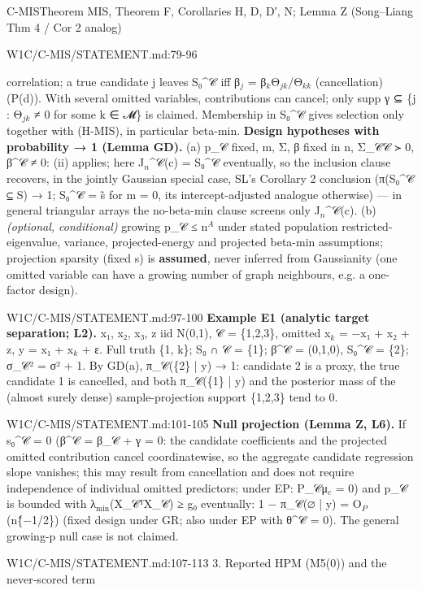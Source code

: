 \begin{card}{C-MIS}{Theorem MIS, Theorem F, Corollaries H, D, D′, N; Lemma Z (Song–Liang Thm 4 / Cor 2 analog)}
\begin{stmt}{W1C/C-MIS/STATEMENT.md:79-96}
\begin{itemize}
correlation; a true candidate j leaves S₀\^{}𝒞 iff β$_{j}$ = β$_{k}$Θ$_{jk}$/Θ$_{kk}$ (cancellation) (P(d)). With several omitted
variables, contributions can cancel; only supp γ ⊆ \{j : Θ$_{jk}$ ≠ 0 for some k ∈ 𝓜\} is claimed. Membership in S₀\^{}𝒞 gives
selection only together with (H-MIS), in particular beta-min.
\textbf{Design hypotheses with probability → 1 (Lemma GD).} (a) p\_𝒞 fixed, m, Σ, β fixed in n, Σ\_𝒞𝒞 ≻ 0, β\^{}𝒞 ≠ 0: (ii)
applies; here J$_{n}$\^{}𝒞(c) = S₀\^{}𝒞 eventually, so the inclusion clause recovers, in the jointly Gaussian special case,
SL's Corollary 2 conclusion (π(S₀\^{}𝒞 ⊆ S) → 1; S₀\^{}𝒞 = s̃ for m = 0, its intercept-adjusted analogue otherwise) — in general triangular arrays the no-beta-min clause screens only J$_{n}$\^{}𝒞(c). (b) \emph{(optional, conditional)} growing p\_𝒞 ≤ n$^{A}$ under stated population restricted-eigenvalue, variance,
projected-energy and projected beta-min assumptions; projection sparsity (fixed s) is \textbf{assumed}, never inferred from
Gaussianity (one omitted variable can have a growing number of graph neighbours, e.g. a one-factor design).
\end{itemize}
\end{stmt}
\begin{stmt}{W1C/C-MIS/STATEMENT.md:97-100}
\textbf{Example E1 (analytic target separation; L2).} x₁, x₂, x₃, z iid N(0,1), 𝒞 = \{1,2,3\}, omitted x$_{k}$ = −x₁ + x₂ + z,
y = x₁ + x$_{k}$ + ε. Full truth \{1, k\}; S₀ ∩ 𝒞 = \{1\}; β\^{}𝒞 = (0,1,0), S₀\^{}𝒞 = \{2\}; σ\_𝒞² = σ² + 1. By GD(a), π\_𝒞(\{2\} | y) → 1:
candidate 2 is a proxy, the true candidate 1 is cancelled, and both π\_𝒞(\{1\} | y) and the posterior mass of the
(almost surely dense) sample-projection support \{1,2,3\} tend to 0.
\end{stmt}
\begin{stmt}{W1C/C-MIS/STATEMENT.md:101-105}
\textbf{Null projection (Lemma Z, L6).} If s₀\^{}𝒞 = 0 (β\^{}𝒞 = β\_𝒞 + γ = 0: the candidate coefficients and the projected omitted
contribution cancel coordinatewise, so the aggregate candidate regression slope vanishes; this may result from cancellation and does
not require independence of individual omitted predictors; under EP:
P\_𝒞μ$_{c}$ = 0) and p\_𝒞 is bounded with λ$_{\mathrm{min}}$(X\_𝒞ᵀX\_𝒞) ≥ g₀ eventually: 1 − π\_𝒞(∅ | y) = O$_{P}$(n\^\{−1/2\})
(fixed design under GR; also under EP with θ\^{}𝒞 = 0). The general growing-p null case is not claimed.
\end{stmt}
\begin{stmt}{W1C/C-MIS/STATEMENT.md:107-113}
3. Reported HPM (M5(0)) and the never-scored term


\end{stmt}
\end{card}
